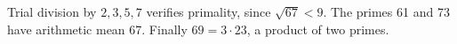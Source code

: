 Trial division by $2,3,5,7$ verifies primality, since $\sqrt{67}<9$. The primes 61 and 73 have arithmetic mean 67. Finally $69=3\cdot23$, a product of two primes.
